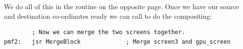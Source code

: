 \begin{figure}[H]
{
  }
\end{figure}

We do all of this in the  routine on the opposite page. Once we have our source
and destination co-ordinates ready we can call  to do the compositing:

\begin{lstlisting}
        ; Now we can merge the two screens together. 
pmf2:   jsr MergeBlock             ; Merge screen3 and gpu_screen
\end{lstlisting}

